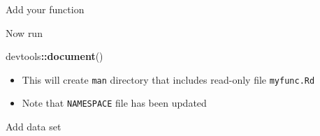 \documentclass[
  ignorenonframetext,
]{beamer}
\newenvironment{Shaded}{\begin{snugshade}}{\end{snugshade}}
\newcommand{\KeywordTok}[1]{\textcolor[rgb]{0.13,0.29,0.53}{\textbf{#1}}}
\newcommand{\NormalTok}[1]{#1}
\newcommand{\OperatorTok}[1]{\textcolor[rgb]{0.81,0.36,0.00}{\textbf{#1}}}
\providecommand{\tightlist}{%
  \setlength{\itemsep}{0pt}\setlength{\parskip}{0pt}}
\begin{document}
\begin{frame}[fragile]{Add your function}
\protect\hypertarget{add-your-function-3}{}

Now run

\begin{Shaded}
\begin{Highlighting}[]
\NormalTok{devtools}\OperatorTok{::}\KeywordTok{document}\NormalTok{()}
\end{Highlighting}
\end{Shaded}

\begin{itemize}
\tightlist
\item
  This will create \texttt{man} directory that includes read-only file
  \texttt{myfunc.Rd}
\item
  Note that \texttt{NAMESPACE} file has been updated
\end{itemize}

\end{frame}

\begin{frame}{Add data set}
\protect\hypertarget{add-data-set}{}

\end{frame}
\end{document}
